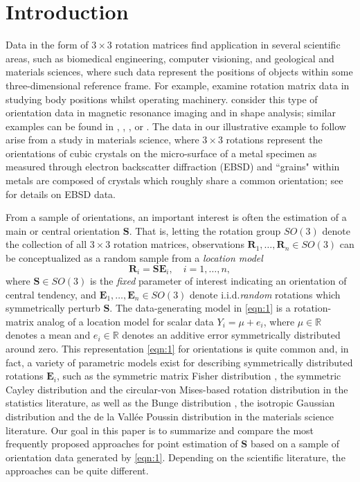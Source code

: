 \section{Introduction}\label{ch:intro}

Data in the form of $3 \times 3$ rotation matrices find application in several scientific areas, 
such as biomedical engineering, computer visioning, and geological and materials sciences, where such data represent the positions of objects within some three-dimensional
reference frame.  For example, \citet{rancourt00} examine rotation matrix data in studying body 
positions whilst operating machinery. \cite{fletcher09} consider this type of  orientation data in 
magnetic resonance imaging and in shape analysis; similar examples  can be found in \cite{schwartz05}, \cite{pierrynowski09},  \cite{dai10},  or \cite{hadani11}.  The data in our illustrative 
example to follow arise from a study in materials science, where $3 \times 3$ rotations represent the orientations of cubic crystals on the micro-surface of a metal specimen as measured through electron backscatter diffraction (EBSD) and ``grains" within metals are composed of crystals which roughly share a common orientation; see \cite{randle03} for details on EBSD data.  
     
From a sample of orientations, an important interest is often the estimation of a main or central orientation $\bm S$.  That is, letting the rotation group $SO(3)$ denote the collection of all $3\times 3$ rotation matrices, observations $\bm{R}_1,\ldots,\bm{R}_n \in SO(3)$ can be conceptualized as a random sample from a \textit{location model}
\begin{equation}
\label{eqn:1}
\mathbf{R}_i = \bm{S} \bm{E}_i, \quad i=1,\ldots,n,
\end{equation}
where $\bm S \in SO(3)$ is the {\it fixed} parameter of interest indicating an orientation of central tendency, and $\bm{E}_1,\ldots,\bm{E}_n \in SO(3)$ denote i.i.d.{\it random} rotations which symmetrically perturb $\bm{S}$. The data-generating model in \eqref{eqn:1} is a rotation-matrix analog of a location model for scalar data $Y_i = \mu + e_i$, where $\mu \in \mathbb{R}$ denotes a mean and $e_i \in \mathbb{R}$ denotes an additive error symmetrically distributed around zero.  This representation \eqref{eqn:1} for orientations is quite common and, in fact,
a variety of parametric models exist for describing symmetrically distributed rotations $\bm{E}_i$, such as the symmetric matrix Fisher distribution \citep{downs72}, the symmetric Cayley distribution
\citep{leon06}  and the circular-von Mises-based rotation distribution \citep{bingham09}   in the statistics literature, as well as the Bunge distribution \citep{bunge82}, the isotropic Gaussian
distribution \citep{matthies88, savyolova95} and the de la Vall\'{e}e Poussin distribution \citep{Schaeben97} in the materials science literature. Our goal in this paper is to summarize and compare the most frequently proposed approaches for point estimation of $\bm S$ based on a sample of orientation data generated by \eqref{eqn:1}.  Depending on the scientific literature, the approaches can be quite different.

